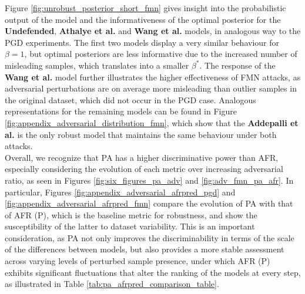 Figure \ref{fig:unrobust_posterior_short_fmn} gives insight into the probabilistic output
of the model and the informativeness of the optimal posterior for the {\color{tab:orange} \textbf{Undefended}}, 
{\color{tab:green} \textbf{Athalye et al.}} and {\color{tab:brown} \textbf{Wang et al.}} models, in
analogous way to the PGD experiments. The first two models display a very similar behaviour for 
$\beta = 1$, but optimal posteriors are less informative due to the increased number of misleading
samples, which translates into a smaller $\beta^{*}$. The response of 
the {\color{tab:brown} \textbf{Wang et al.}} model further illustrates the higher effectiveness of
FMN attacks, as adversarial perturbations are on average more misleading than outlier samples in
the original dataset, which did not occur in the PGD case. Analogous representations for the remaining
models can be found in Figure \ref{fig:appendix_adversarial_distribution_fmn}, which show
that the {\color{tab:purple} \textbf{Addepalli et al.}} is the only robust model that maintains
the same behaviour under both attacks.\\

Overall, we recognize that PA has a higher discriminative power than AFR, especially
considering the evolution of each metric over increasing adversarial ratio, as
seen in Figures \ref{fig:six_figures_pa_adv} and \ref{fig:adv_fmn_pa_afr}. 
In particular, Figures \ref{fig:appendix_adversarial_afrpred_pgd} and \ref{fig:appendix_adversarial_afrpred_fmn}
compare the evolution of PA with that of AFR (P), which is the baseline metric for robustness,
and show the susceptibility of the latter to dataset variability. This is an important
consideration, as PA not only improves the discriminability in terms of the scale of
the differences between models, but also provides a more stable assessment across varying
levels of perturbed sample presence, under which AFR (P) exhibits significant fluctuations
that alter the ranking of the models at every step, as illustrated in Table \ref{tab:pa_afrpred_comparison_table}. \\


